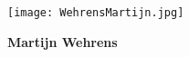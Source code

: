 

\begin{figure}
    \hfill
    \begin{minipage}[c]{0.25\textwidth}
        \texttt{[image: WehrensMartijn.jpg]}
        \caption*{\textbf{Martijn Wehrens}}
    \end{minipage}
\end{figure}

%
%
%
%
%
%
%
%
%
%

%
%
%
%    


